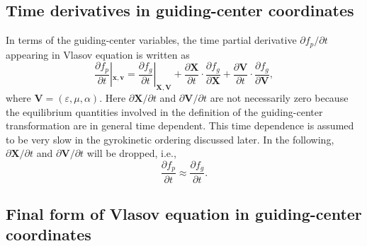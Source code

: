 \documentclass{llncs}
\newcommand{\nobracket}{}
\begin{document}
\subsection{Time derivatives in guiding-center coordinates}

In terms of the guiding-center variables, the time partial derivative
$\partial f_p / \partial t$ appearing in Vlasov equation is written as
\begin{equation}
  \frac{\partial f_p}{\partial t} |_{\mathbf{x}, \mathbf{v}} \nobracket =
  \frac{\partial f_g}{\partial t} |_{\mathbf{X}, \mathbf{V}} \nobracket +
  \frac{\partial \mathbf{X}}{\partial t} \cdot \frac{\partial f_g}{\partial
  \mathbf{X}} + \frac{\partial \mathbf{V}}{\partial t} \cdot \frac{\partial
  f_g}{\partial \mathbf{V}},
\end{equation}
where $\mathbf{V}= (\varepsilon, \mu, \alpha)$. Here $\partial \mathbf{X}/
\partial t$ and $\partial \mathbf{V}/ \partial t$ are not necessarily zero
because the equilibrium quantities involved in the definition of the
guiding-center transformation are in general time dependent. This time
dependence is assumed to be very slow in the gyrokinetic ordering discussed
later. In the following, $\partial \mathbf{X}/ \partial t$ and $\partial
\mathbf{V}/ \partial t$ will be dropped, i.e.,
\begin{equation}
  \frac{\partial f_p}{\partial t} \approx \frac{\partial f_g}{\partial t} .
\end{equation}

\subsection{Final form of Vlasov equation in guiding-center coordinates}
\end{document}
